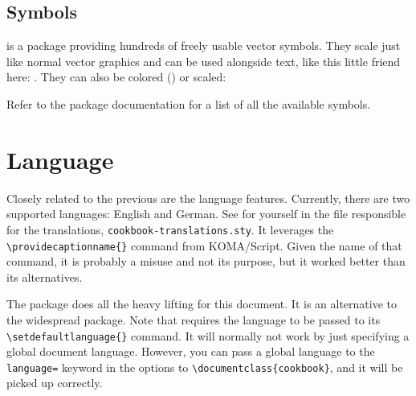 \begin{table}\ContinuedFloat
\end{table}

\subsection{Symbols}

 is a package providing hundreds of freely usable vector
symbols.
They scale just like normal vector graphics and can be used alongside text, like
this little friend here: \faFirefox{}.
They can also be colored (\textcolor{mRed}{\faInternetExplorer{}}) or scaled:
\begin{center}
    \scalebox{20}{\faLinux{}}
\end{center}
Refer to the package documentation for a list of all the available symbols.

\section{Language}

Closely related to the previous  are the language features.
Currently, there are two supported languages: English and German.
See for yourself in the file responsible for the translations,
\verb|cookbook-translations.sty|.
It leverages the \verb|\providecaptionname{}| command from KOMA\-/Script.
Given the name of that command, it is probably a misuse and not its purpose, but
it worked better than its alternatives.

The  package does all the heavy lifting for this document.
It is an alternative to the widespread  package.
Note that  requires the language to be passed to its
\verb|\setdefaultlanguage{}| command.
It will normally not work by just specifying a global document language.
However, you can pass a global language to the \verb|language=| keyword in the
options to \verb|\documentclass{cookbook}|, and it will be picked up correctly.

